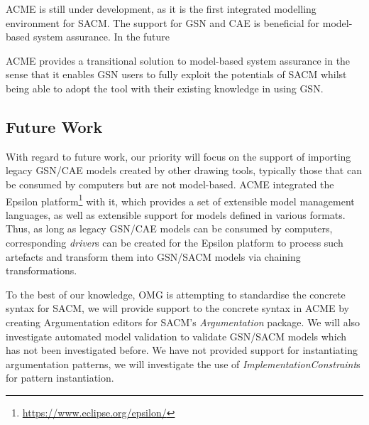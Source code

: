 ACME is still under development, as it is the first integrated modelling environment for SACM. The support for GSN and CAE is beneficial for model-based system assurance. In the future

ACME provides a transitional solution to model-based system assurance in the sense that it enables GSN users to fully exploit the potentials of SACM whilst being able to adopt the tool with their existing knowledge in using GSN. 

\subsection{Future Work}
With regard to future work, our priority will focus on the support of importing legacy GSN/CAE models created by other drawing tools, typically those that can be consumed by computers but are not model-based. 
ACME integrated the Epsilon platform\footnote{\url{https://www.eclipse.org/epsilon/}} with it, which provides a set of extensible model management languages, as well as extensible support for models defined in various formats.
Thus, as long as legacy GSN/CAE models can be consumed by computers, corresponding \textit{driver}s can be created for the Epsilon platform to process such artefacts and transform them into GSN/SACM models via chaining transformations.

To the best of our knowledge, OMG is attempting to standardise the concrete syntax for SACM, we will provide support to the concrete syntax in ACME by creating Argumentation editors for SACM's \textit{Argumentation} package. 
We will also investigate automated model validation to validate GSN/SACM models which has not been investigated before. We have not provided support for instantiating argumentation patterns, we will investigate the use of \textit{ImplementationConstraint}s for pattern instantiation.